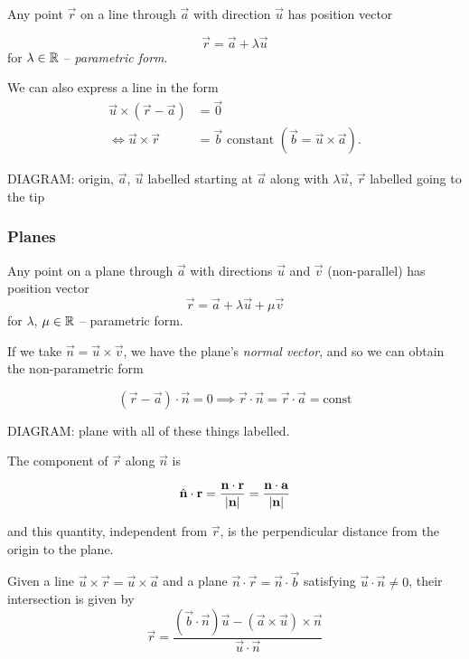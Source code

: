 \documentclass{../template/note}
\begin{document}
    Any point \(\vec r\) on a line through \(\vec a\) with direction \(\vec u\) has position vector

    \[  
        \vec r = \vec a + \lambda \vec u 
    \]
    for \(\lambda \in \mathbb R\) -- \emph{parametric form}.

    We can also express a line in the form
    \begin{align*}
        \vec u \times (\vec r - \vec a) &= \vec 0 \\
        \iff \vec u \times \vec r &= \vec b \text{ constant } (\vec b = \vec u \times \vec a).
    \end{align*}

    
    DIAGRAM: origin, \(\vec a\), \(\vec u\) labelled starting at \(\vec a\) along with \(\lambda \vec u\), \(\vec r\) labelled going to the tip

    \subsubsection{Planes}

    Any point on a plane through \(\vec a\) with directions \(\vec u\) and \(\vec v\) (non-parallel) has position vector
    \[
        \vec r = \vec a + \lambda \vec u + \mu \vec v
    \]
    for \(\lambda\), \(\mu \in \mathbb R\) -- parametric form.

    If we take \(\vec n = \vec u \times \vec v\), we have the plane's \emph{normal vector}, and so we can obtain the non-parametric form

    \[  
        (\vec r - \vec a) \cdot \vec n = 0 \implies \vec r \cdot \vec n = \vec r \cdot \vec a = \text{const}
    \]

    DIAGRAM: plane with all of these things labelled.

    The component of \(\vec r\) along \(\vec n\) is

    \[
        \hvec n \cdot \vec r = \frac{\vec n \cdot \vec r}{|\vec n|} = \frac{\vec n \cdot \vec a}{|\vec n|}
    \]

    and this quantity, independent from \(\vec r\), is the perpendicular distance from the origin to the plane.

    \begin{proposition}
        Given a line \(\vec u \times \vec r = \vec u \times \vec a\) and a plane \(\vec n \cdot \vec r = \vec n \cdot \vec b\) satisfying \(\vec u \cdot \vec n \neq 0\), their intersection is given by
        \[
            \vec r = \frac{(\vec b \cdot \vec n)\vec u - (\vec a \times \vec u) \times \vec n}{\vec u \cdot \vec n}
        \]
    \end{proposition}
    
\end{document}
